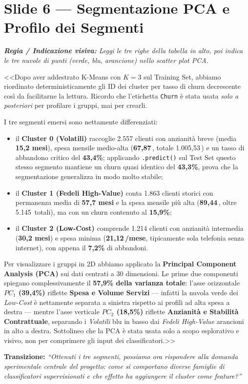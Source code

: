 \documentclass[10pt, a4paper]{article}
\newcommand{\cue}[1]{%
  \par\vspace{2pt}\noindent\colorbox{CueBg}{\parbox{\dimexpr\linewidth-2\fboxsep}{\footnotesize\textit{\color{PrimaryNavy}\textbf{Regia / Indicazione visiva:} #1}}}\par\vspace{3pt}%
}
\newcommand{\transition}[1]{%
  \par\vspace{2pt}\noindent\colorbox{LightBg}{\parbox{\dimexpr\linewidth-2\fboxsep}{\small\textbf{\color{SecondaryBlue}Transizione:} \textit{``#1''}}}\par\vspace{4pt}%
}
\begin{document}
\section*{Slide 6 --- Segmentazione PCA e Profilo dei Segmenti}
\cue{Leggi le tre righe della tabella in alto, poi indica le tre nuvole di punti (verde, blu, arancione) nello scatter plot PCA.}
\noindent <<Dopo aver addestrato K-Means con $K=3$ sul Training Set, abbiamo riordinato deterministicamente gli ID dei cluster per tasso di churn decrescente così da facilitarne la lettura. Ricordo che l'etichetta \texttt{Churn} è stata usata \textit{solo a posteriori} per profilare i gruppi, mai per crearli.

I tre segmenti emersi sono nettamente differenziati:
\begin{itemize}
    \item il \textbf{Cluster 0 (Volatili)} raccoglie 2.557 clienti con anzianità breve (media \textbf{15,2 mesi}), spesa mensile medio-alta (\textbf{67,87\,\texteuro}, totale 1.005,53\,\texteuro) e un tasso di abbandono critico del \textbf{43,4\%}; applicando \texttt{.predict()} sul Test Set questo stesso segmento mantiene un churn quasi identico del \textbf{43,3\%}, prova che la segmentazione generalizza in modo molto stabile;
    \item il \textbf{Cluster 1 (Fedeli High-Value)} conta 1.863 clienti storici con permanenza media di \textbf{57,7 mesi} e la spesa mensile più alta (\textbf{89,44\,\texteuro}, oltre 5.145\,\texteuro{} totali), ma con un churn contenuto al \textbf{15,9\%};
    \item il \textbf{Cluster 2 (Low-Cost)} comprende 1.214 clienti con anzianità intermedia (\textbf{30,2 mesi}) e spesa minima (\textbf{21,12\,\texteuro/mese}, tipicamente sola telefonia senza internet), con appena il \textbf{7,2\%} di abbandoni.
\end{itemize}
Per visualizzare i gruppi in 2D abbiamo applicato la \textbf{Principal Component Analysis (PCA)} sui dati centrati a 30 dimensioni. Le prime due componenti spiegano complessivamente il \textbf{57,9\% della varianza totale}: l'asse orizzontale \textbf{$PC_1$ (39,4\%)} riflette \textbf{Spesa e Volume Servizi} --- infatti la nuvola verde dei \textit{Low-Cost} è nettamente separata a sinistra rispetto ai profili ad alta spesa a destra --- mentre l'asse verticale \textbf{$PC_2$ (18,5\%)} riflette \textbf{Anzianità e Stabilità Contrattuale}, separando i \textit{Volatili} blu in basso dai \textit{Fedeli High-Value} arancioni in alto a destra. Sottolineo che la PCA è stata usata solo a scopo esplorativo e visivo, non per comprimere gli input dei classificatori.>>
\transition{Ottenuti i tre segmenti, possiamo ora rispondere alla domanda sperimentale centrale del progetto: come si comportano diverse famiglie di classificatori supervisionati e che effetto ha aggiungere il cluster come feature?}
\end{document}
